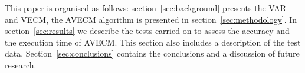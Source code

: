 This paper is organised as follows: section~\ref{sec:background} presents the
VAR and VECM, the AVECM algorithm is presented in section~\ref{sec:methodology}.
In section~\ref{sec:results} we describe the tests carried on to assess the
accuracy and the execution time of AVECM.  This section also includes a
description of the test data.  Section~\ref{sec:conclusions} contains the
conclusions and a discussion of future research.

